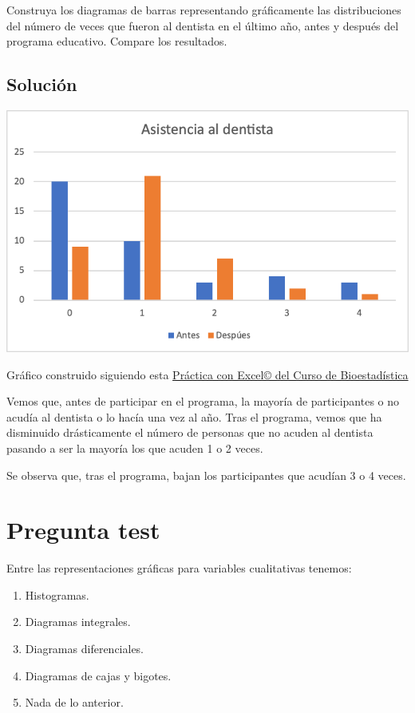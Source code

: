 \documentclass[
]{book}
\providecommand{\tightlist}{%
  \setlength{\itemsep}{0pt}\setlength{\parskip}{0pt}}
\begin{document}
Construya los diagramas de barras representando gráficamente las distribuciones del número de veces que fueron al dentista en el último año, antes y después del programa educativo. Compare los resultados.

\hypertarget{soluciuxf3n-7}{%
\subsection{Solución}\label{soluciuxf3n-7}}

\includegraphics[width=10.03in]{img/2_3}

Gráfico construido siguiendo esta \href{https://1fjmanzano.github.io/bioestadistica/diagramas-de-barras-y-sectores.html}{Práctica con Excel© del Curso de Bioestadística}

Vemos que, antes de participar en el programa, la mayoría de participantes o no acudía al dentista o lo hacía una vez al año. Tras el programa, vemos que ha disminuido drásticamente el número de personas que no acuden al dentista pasando a ser la mayoría los que acuden 1 o 2 veces.

Se observa que, tras el programa, bajan los participantes que acudían 3 o 4 veces.

\hypertarget{pregunta-test-56}{%
\section{Pregunta test}\label{pregunta-test-56}}

Entre las representaciones gráficas para variables cualitativas tenemos:

\begin{enumerate}
\def\labelenumi{\alph{enumi})}
\tightlist
\item
  Histogramas.
\item
  Diagramas integrales.
\item
  Diagramas diferenciales.
\item
  Diagramas de cajas y bigotes.
\item
  Nada de lo anterior.
\end{enumerate}
\end{document}
